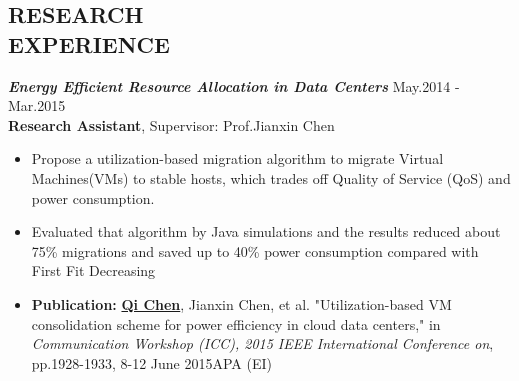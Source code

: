 \documentclass[margin,line]{res}
\begin{document}
\begin{resume}
\section{RESEARCH \\ EXPERIENCE}
        {\sl \textbf{Energy Efficient Resource Allocation in Data Centers}} \hfill May.2014 - Mar.2015 \\[1mm]
        \vspace{0.1mm}
        \quad \textbf{Research Assistant}, Supervisor: Prof.Jianxin Chen
         \vspace{1mm}
        \begin{itemize}
            \item Propose a utilization-based migration algorithm to migrate Virtual Machines(VMs) to stable hosts, which trades off Quality of Service (QoS) and power consumption.
	\item Evaluated that algorithm by Java simulations and the results reduced about 75\% migrations and saved up to 40\% power consumption compared with First Fit Decreasing 
\item \textbf{Publication:} \underline{\textbf{Qi Chen}}, Jianxin Chen, et al. "Utilization-based VM consolidation scheme for power efficiency in cloud data centers," in \emph{Communication Workshop (ICC), 2015 IEEE International Conference on}, pp.1928-1933, 8-12 June 2015APA (EI)
        \end{itemize}

\end{resume}
\end{document}
